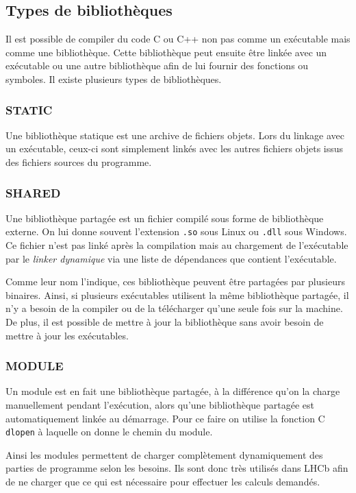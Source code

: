 \documentclass[a4paper]{report}
\begin{document}
\subsection{Types de bibliothèques}
Il est possible de compiler du code C ou C++ non pas comme un exécutable mais comme une bibliothèque.
Cette bibliothèque peut ensuite être linkée avec un exécutable ou une autre bibliothèque afin de lui fournir des fonctions ou symboles.
Il existe plusieurs types de bibliothèques.

\subsubsection{STATIC}
Une bibliothèque statique est une archive de fichiers objets.
Lors du linkage avec un exécutable, ceux-ci sont simplement linkés avec les autres fichiers objets issus des fichiers sources du programme.

\subsubsection{SHARED}
Une bibliothèque partagée est un fichier compilé sous forme de bibliothèque externe.
On lui donne souvent l'extension \verb'.so' sous Linux ou \verb'.dll' sous Windows.
Ce fichier n'est pas linké après la compilation mais au chargement de l'exécutable par le \emph{linker dynamique} via une liste de dépendances que contient l'exécutable.

Comme leur nom l'indique, ces bibliothèque peuvent être partagées par plusieurs binaires.
Ainsi, si plusieurs exécutables utilisent la même bibliothèque partagée, il n'y a besoin de la compiler ou de la télécharger qu'une seule fois sur la machine.
De plus, il est possible de mettre à jour la bibliothèque sans avoir besoin de mettre à jour les exécutables.

\subsubsection{MODULE}
Un module est en fait une bibliothèque partagée, à la différence qu'on la charge manuellement pendant l'exécution, alors qu'une bibliothèque partagée est automatiquement linkée au démarrage.
Pour ce faire on utilise la fonction C \verb'dlopen' à laquelle on donne le chemin du module.

Ainsi les modules permettent de charger complètement dynamiquement des parties de programme selon les besoins.
Ils sont donc très utilisés dans LHCb afin de ne charger que ce qui est nécessaire pour effectuer les calculs demandés.
\end{document}
